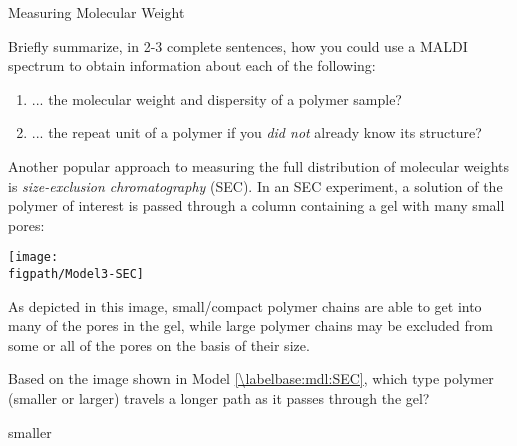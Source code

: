\begin{activity}{Measuring Molecular Weight}
\begin{ctqs}
	\question Briefly summarize, in 2-3 complete sentences, how you could use a MALDI spectrum to obtain information about each of the following:
	
		\begin{enumerate}
			\item ... the molecular weight and dispersity of a polymer sample?
		\begin{solution}[2in]
		\end{solution}
				
			\item ... the repeat unit of a polymer if you \emph{did not} already know its structure?
		\begin{solution}[2in]
		\end{solution}
		
		\end{enumerate}
		
		
\end{ctqs}



\begin{model}
\label{\labelbase:mdl:SEC}
	
	Another popular approach to measuring the full distribution of molecular weights is \emph{size-exclusion chromatography} (SEC).
	In an SEC experiment, a solution of the polymer of interest is passed through a column containing a gel with many small pores:
	
	\vspace{12pt}
	\centerline{\texttt{[image: \\figpath/Model3-SEC]}}
	
	As depicted in this image, small/compact polymer chains are able to get into many of the pores in the gel, while large polymer chains may be excluded from some or all of the pores on the basis of their size.

\end{model}

\begin{ctqs}

	\question Based on the image shown in Model \ref{\labelbase:mdl:SEC}, which type polymer (smaller or larger) travels a longer path as it passes through the gel?
	
		\begin{solution}[0.5in]
			smaller
		\end{solution}
	

\end{ctqs}
\end{activity}
